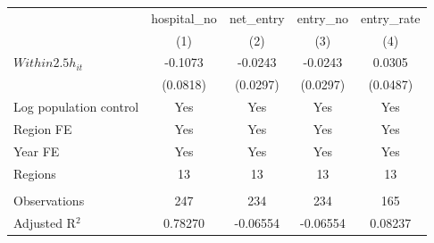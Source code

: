 \begingroup
\centering
\begin{tabular}{lcccc}
   \toprule
                          & hospital\_no  & net\_entry  & entry\_no  & entry\_rate \\    
                          & (1)           & (2)         & (3)        & (4)\\  
   \midrule 
   $Within2.5h_{it}$      & -0.1073       & -0.0243     & -0.0243    & 0.0305\\   
                          & (0.0818)      & (0.0297)    & (0.0297)   & (0.0487)\\   
   Log population control & Yes           & Yes         & Yes        & Yes\\  
   Region FE              & Yes           & Yes         & Yes        & Yes\\  
   Year FE                & Yes           & Yes         & Yes        & Yes\\  
   Regions                & 13            & 13          & 13         & 13\\  
    \\
   Observations           & 247           & 234         & 234        & 165\\  
   Adjusted R$^2$         & 0.78270       & -0.06554    & -0.06554   & 0.08237\\  
   \bottomrule
\end{tabular}
\par\endgroup
